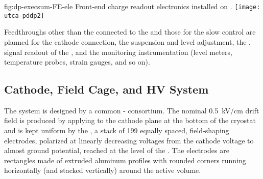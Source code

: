 \begin{dunefigure}{fig:dp-execsum-FE-ele}
  {Front-end charge readout electronics installed on .}
  \texttt{[image: utca-pddp2]}
\end{dunefigure}

Feedthroughs other than the  connected to the  and those for the  slow control are planned for the cathode  connection, the  suspension and level adjustment, the , signal readout of the , and the monitoring instrumentation (level meters, temperature probes, strain gauges, and so on).

\subsection{Cathode, Field Cage, and HV System}
\label{sec:dp-execsum-cathode}

The  system is designed by a common - consortium. The nominal \SI{0.5}{kV/cm} drift field is produced by applying  to the cathode plane at the bottom of the cryostat and is kept uniform by the , a stack of \num{199} equally spaced, field-shaping electrodes,  polarized at linearly decreasing voltages from the cathode  voltage to almost ground potential, reached at the level of the . The electrodes are rectangles made of extruded aluminum profiles  with rounded corners running horizontally (and stacked vertically) around the active volume. 


